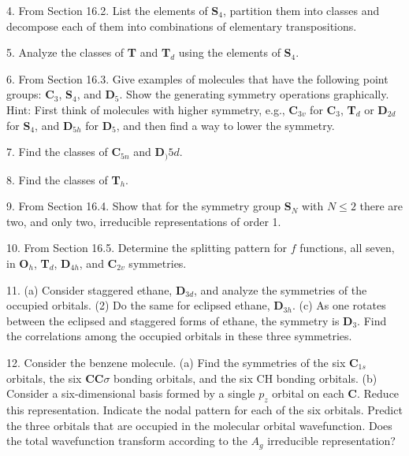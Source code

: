 \item {4.} From Section 16.2.  List the elements of {\bf S}$_4$, 
partition them into classes and decompose each of them into 
combinations of elementary transpositions.

\item {5.} Analyze the classes of {\bf T} and {\bf T}$_d$ using the 
elements of {\bf S}$_4$.

\item {6.} From Section 16.3.  Give examples of molecules that have 
the following point groups: {\bf C}$_3$, {\bf S}$_4$, and {\bf 
D}$_5$.  Show the generating symmetry operations graphically.  Hint: 
First think of molecules with higher symmetry, e.g., {\bf C}$_{3v}$ 
for {\bf C}$_3$, {\bf T}$_d$ or {\bf D}$_{2d}$ for {\bf S}$_4$, and 
{\bf D}$_{5h}$ for {\bf D}$_5$, and then find a way to lower the 
symmetry.

\item {7.} Find the classes of {\bf C}$_{5n}$ and {\bf D}$_){5d}$.

\item {8.} Find the classes of {\bf T}$_h$.

\item {9.} From Section 16.4.  Show that for the symmetry group {\bf 
S}$_N$ with $N \leq 2$ there are two, and only two, irreducible 
representations of order 1.

\item {10.}  From Section 16.5.  Determine the splitting pattern for 
$f$ functions, all seven, in {\bf O}$_h$, {\bf T}$_d$, {\bf D}$_{4h}$, 
and {\bf C}$_{2v}$ symmetries.

\item {11.} (a) Consider staggered ethane, {\bf D}$_{3d}$, and analyze 
the symmetries of the occupied orbitals.  (2) Do the same for eclipsed 
ethane, {\bf D}$_{3h}$.  (c) As one rotates between the eclipsed and 
staggered forms of ethane, the symmetry is {\bf D}$_3$.  Find the 
correlations among the occupied orbitals in these three symmetries.

\item {12.}  Consider the benzene molecule.  (a) Find the symmetries 
of the six {\bf C}$_{1s}$ orbitals, the six {\bf CC}$\sigma$ bonding 
orbitals, and the six CH bonding orbitals.  (b) Consider a 
six-dimensional basis formed by a single $p_z$ orbital on each {\bf 
C}.  Reduce this representation.  Indicate the nodal pattern for each 
of the six orbitals.  Predict the three orbitals that are occupied in 
the molecular orbital wavefunction.   Does the total wavefunction 
transform according to the $A_g$ irreducible representation?

